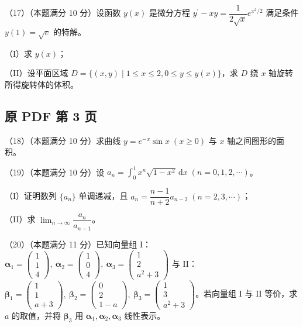 \documentclass[UTF8,12pt]{ctexart}
\begin{document}
（17）（本题满分 10 分）设函数 \(\displaystyle y(x)\) 是微分方程 \(\displaystyle y^\prime-xy=\dfrac{\displaystyle 1}{\displaystyle 2\sqrt x}e^{x^2/2}\) 满足条件 \(\displaystyle y(1)=\sqrt e\) 的特解。


（I）求 \(\displaystyle y(x)\)；


（II）设平面区域 \(\displaystyle D=\{(x,\allowbreak y)\mid1\leq x\leq2,\allowbreak 0\leq y\leq y(x)\}\)，求 \(\displaystyle D\) 绕 \(\displaystyle x\) 轴旋转所得旋转体的体积。


\clearpage

\subsection*{原 PDF 第 3 页}

（18）（本题满分 10 分）求曲线 \(\displaystyle y=e^{-x}\sin x\;(x\geq0)\) 与 \(\displaystyle x\) 轴之间图形的面积。


（19）（本题满分 10 分）设 \(\displaystyle a_n=\displaystyle \int_0^1x^n\sqrt{1-x^2}\,\mathrm dx\;(n=0,\allowbreak 1,\allowbreak 2,\allowbreak \cdots)\)。


（I）证明数列 \(\displaystyle \{a_n\}\) 单调递减，且 \(\displaystyle a_n=\dfrac{\displaystyle n-1}{\displaystyle n+2}a_{n-2}\;(n=2,\allowbreak 3,\allowbreak \cdots)\)；


（II）求 \(\displaystyle \lim_{n\to\infty}\dfrac{\displaystyle a_n}{\displaystyle a_{n-1}}\)。


（20）（本题满分 11 分）已知向量组 I：\(\displaystyle \boldsymbol\alpha_1=\begin{pmatrix}1\\1\\4\end{pmatrix},\allowbreak \ \boldsymbol\alpha_2=\begin{pmatrix}1\\0\\4\end{pmatrix},\allowbreak \ \boldsymbol\alpha_3=\begin{pmatrix}1\\2\\a^2+3\end{pmatrix}\) 与 II：\(\displaystyle \boldsymbol\beta_1=\begin{pmatrix}1\\1\\a+3\end{pmatrix},\allowbreak \ \boldsymbol\beta_2=\begin{pmatrix}0\\2\\1-a\end{pmatrix},\allowbreak \ \boldsymbol\beta_3=\begin{pmatrix}1\\3\\a^2+3\end{pmatrix}\)。若向量组 I 与 II 等价，求 \(\displaystyle a\) 的取值，并将 \(\displaystyle \boldsymbol\beta_3\) 用 \(\displaystyle \boldsymbol\alpha_1,\allowbreak \boldsymbol\alpha_2,\allowbreak \boldsymbol\alpha_3\) 线性表示。
\end{document}
